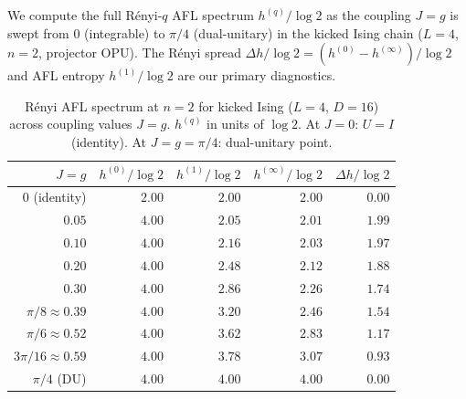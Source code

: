 \documentclass[12pt,a4paper]{article}
\begin{document}
We compute the full R\'enyi-$q$ AFL spectrum $h^{(q)}/\log 2$ as the
coupling $J=g$ is swept from $0$ (integrable) to $\pi/4$ (dual-unitary)
in the kicked Ising chain ($L=4$, $n=2$, projector OPU).  The
R\'enyi spread $\Delta h/\log 2 = (h^{(0)}-h^{(\infty)})/\log 2$ and
AFL entropy $h^{(1)}/\log 2$ are our primary diagnostics.

\begin{table}[h!]
\centering
\caption{R\'enyi AFL spectrum at $n=2$ for kicked Ising ($L=4$, $D=16$)
across coupling values $J=g$. $h^{(q)}$ in units of $\log 2$.
At $J=0$: $U=I$ (identity). At $J=g=\pi/4$: dual-unitary point.}
\label{tab:renyi_phase}
\begin{tabular}{r|rrr|r}
\hline
$J=g$ & $h^{(0)}/\log2$ & $h^{(1)}/\log2$ & $h^{(\infty)}/\log2$ & $\Delta h/\log 2$ \\
\hline
$0$ (identity) & $2.00$ & $2.00$ & $2.00$ & $0.00$ \\
$0.05$ & $4.00$ & $2.05$ & $2.01$ & $1.99$ \\
$0.10$ & $4.00$ & $2.16$ & $2.03$ & $1.97$ \\
$0.20$ & $4.00$ & $2.48$ & $2.12$ & $1.88$ \\
$0.30$ & $4.00$ & $2.86$ & $2.26$ & $1.74$ \\
$\pi/8\approx0.39$ & $4.00$ & $3.20$ & $2.46$ & $1.54$ \\
$\pi/6\approx0.52$ & $4.00$ & $3.62$ & $2.83$ & $1.17$ \\
$3\pi/16\approx0.59$ & $4.00$ & $3.78$ & $3.07$ & $0.93$ \\
$\pi/4$ (DU) & $4.00$ & $4.00$ & $4.00$ & $0.00$ \\
\hline
\end{tabular}
\end{table}
\end{document}
